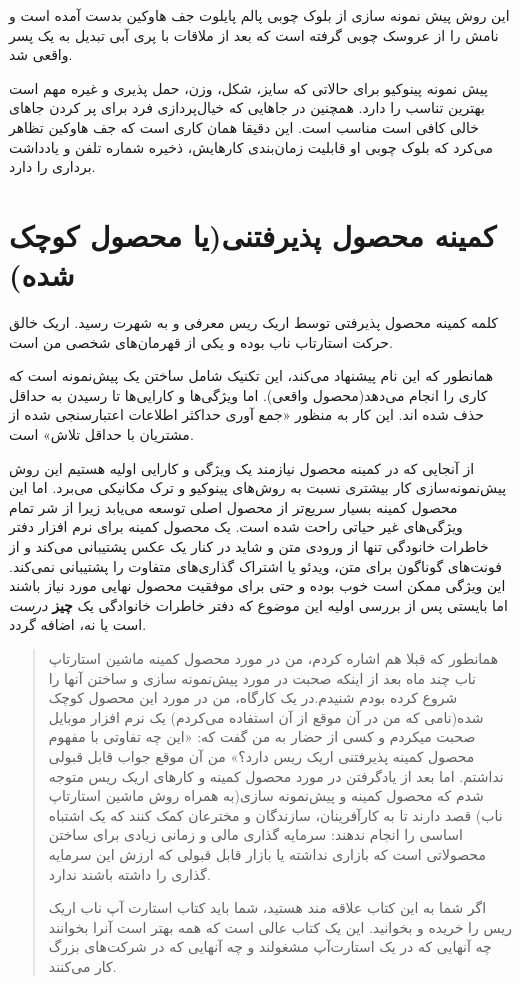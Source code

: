 این روش پیش نمونه سازی از بلوک چوبی پالم پایلوت جف هاوکین بدست آمده است
و نامش را از عروسک چوبی گرفته است که بعد از ملاقات با پری آبی تبدیل به
یک پسر واقعی شد.

پیش نمونه پینوکیو برای حالاتی که سایز، شکل، وزن، حمل پذیری و غیره مهم
است بهترین تناسب را دارد. همچنین در جاهایی که خیال‌پردازی فرد برای پر
کردن جاهای خالی کافی است مناسب است. این دقیقا همان کاری است که جف هاوکین
تظاهر می‌کرد که بلوک چوبی او قابلیت زمان‌بندی کارهایش، ذخیره شماره تلفن
و یادداشت برداری را دارد.

\section{کمینه محصول پذیرفتنی(یا محصول کوچک
شده)}\label{ux6a9ux645ux6ccux646ux647-ux645ux62dux635ux648ux644-ux67eux630ux6ccux631ux641ux62aux646ux6ccux6ccux627-ux645ux62dux635ux648ux644-ux6a9ux648ux686ux6a9-ux634ux62fux647}

کلمه کمینه محصول پذیرفتی توسط اریک ریس معرفی و به شهرت رسید. اریک خالق
حرکت استارتاب ناب بوده و یکی از قهرمان‌های شخصی من است.

همانطور که این نام پیشنهاد می‌کند، این تکنیک شامل ساختن یک پیش‌نمونه‌
است که کاری را انجام می‌دهد(محصول واقعی). اما ویژگی‌ها و کارایی‌ها تا
رسیدن به حداقل حذف شده اند. این کار به منظور «جمع آوری حداکثر اطلاعات
اعتبارسنجی شده از مشتریان با حداقل تلاش» است.

از آنجایی که در کمینه محصول نیازمند یک ویژگی و کارایی اولیه هستیم این
روش پیش‌نمونه‌سازی کار بیشتری نسبت به روش‌های پینوکیو و ترک مکانیکی
می‌برد. اما این محصول کمینه بسیار سریع‌تر از محصول اصلی توسعه می‌یابد
زیرا از شر تمام ویژگی‌های غیر حیاتی راحت شده است. یک محصول کمینه برای
نرم افزار دفتر خاطرات خانودگی تنها از ورودی متن و شاید در کنار یک عکس
پشتیبانی می‌کند و از فونت‌های گوناگون برای متن، ویدئو یا اشتراک
گذاری‌های متفاوت را پشتیبانی نمی‌کند. این ویژگی ممکن است خوب بوده و حتی
برای موفقیت محصول نهایی مورد نیاز باشند اما بایستی پس از بررسی اولیه این
موضوع که دفتر خاطرات خانوادگی یک \textbf{چیز} \emph{درست} است یا نه،
اضافه گردد.

\begin{quote}
همانطور که قبلا هم اشاره کردم، من در مورد محصول کمینه ماشین استارتاپ ناب
چند ماه بعد از اینکه صحبت در مورد پیش‌نمونه سازی و ساختن آنها را شروع
کرده بودم شنیدم.در یک کارگاه، من در مورد این محصول کوچک شده(نامی که من
در آن موقع از آن استفاده می‌کردم) یک نرم افزار موبایل صحبت میکردم و کسی
از حضار به من گفت که: «این چه تفاوتی با مفهوم محصول کمینه پذیرفتنی اریک
ریس دارد؟» من آن موقع جواب قابل قبولی نداشتم. اما بعد از یادگرفتن در
مورد محصول کمینه و کارهای اریک ریس متوجه شدم که محصول کمینه و پیش‌نمونه
سازی(به همراه روش ماشین استارتاپ ناب) قصد دارند تا به کارآفرینان،
سازندگان و مخترعان کمک کنند که یک اشتباه اساسی را انجام ندهند: سرمایه
گذاری مالی و زمانی زیادی برای ساختن محصولاتی است که بازاری نداشته یا
بازار قابل قبولی که ارزش این سرمایه گذاری را داشته باشند ندارد.

اگر شما به این کتاب علاقه مند هستید، شما باید کتاب استارت آپ ناب اریک
ریس را خریده و بخوانید. این یک کتاب عالی است که همه بهتر است آنرا
بخوانند چه آنهایی که در یک استارت‌آپ مشغولند و چه آنهایی که در شرکت‌های
بزرگ کار می‌کنند.
\end{quote}

